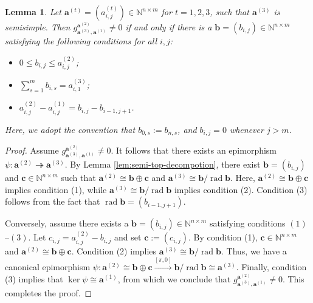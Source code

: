 \documentclass[12pt]{amsart}
\newtheorem{lemma}[theorem]{Lemma}
\theoremstyle{remark}
\theoremstyle{definition}
\numberwithin{equation}{section}
\begin{document}
\begin{lemma}\label{lem:condition-hall-number-non-zero}
    Let $ \mathbf{a}^{(t)}=(a_{i,j}^{(t)})\in \mathbb{N}^{n\times m}$ for $t=1,2,3$, such that $\mathbf{a}^{(3)}$ is semisimple. Then $g_{\mathbf{a}^{(3)},\mathbf{a}^{(1)}}^{\mathbf{a}^{(2)}}\neq 0$ if and only if  there is a $\mathbf{b}=(b_{i,j})\in \mathbb{N}^{n\times m}$ satisfying the following conditions for all $i,j$:
    \begin{itemize}
        \item[(1)] $0\leq b_{i,j}\leq a_{i,j}^{(2)}$;
        \item[(2)] $\sum_{s=1}^mb_{i,s}=a_{i,1}^{(3)}$;
        \item[(3)] $a_{i,j}^{(2)}-a_{i,j}^{(1)}=b_{i,j}-b_{i-1,j+1}$.
    \end{itemize}
  Here, we adopt the convention that $b_{0,s} := b_{n,s}$, and $b_{i,j} = 0$ whenever $j > m$.
\end{lemma}
\begin{proof}
    
Assume $g_{\mathbf{a}^{(3)},\mathbf{a}^{(1)}}^{\mathbf{a}^{(2)}}\neq 0$. It follows that there exists an epimorphism $\psi:\mathbf{a}^{(2)}\twoheadrightarrow \mathbf{a}^{(3)}$. By Lemma \ref{lem:semi-top-decompotion}, there exist $\mathbf{b}=(b_{i,j})$ and $\mathbf{c}\in \mathbb{N}^{n\times m}$ such that $\mathbf{a}^{(2)}\cong \mathbf{b}\oplus \mathbf{c}$ and $\mathbf{a}^{(3)}\cong \mathbf{b}/\operatorname{rad} \mathbf{b}$. Here, $\mathbf{a}^{(2)}\cong \mathbf{b}\oplus \mathbf{c}$ implies condition (1), while $\mathbf{a}^{(3)}\cong \mathbf{b}/\operatorname{rad} \mathbf{b}$ implies condition (2). Condition (3) follows from the fact that $\operatorname{rad}\mathbf{b}=(b_{i-1,j+1})$.

Conversely, assume there exists a $\mathbf{b}=(b_{i,j})\in \mathbb{N}^{n\times m}$ satisfying conditions $(1)$–$(3)$. Let $c_{i,j}=a_{i,j}^{(2)}-b_{i,j}$ and set $\mathbf{c}:=(c_{i,j})$. By condition (1), $\mathbf{c}\in \mathbb{N}^{n\times m}$ and $\mathbf{a}^{(2)}\cong \mathbf{b}\oplus \mathbf{c}$. Condition (2) implies $\mathbf{a}^{(3)}\cong \mathbf{b}/\operatorname{rad}\mathbf{b}$. Thus, we have a canonical epimorphism $\psi:\mathbf{a}^{(2)}\cong \mathbf{b}\oplus \mathbf{c}\xrightarrow{[\pi,0]} \mathbf{b}/\operatorname{rad}\mathbf{b}\cong \mathbf{a}^{(3)}$. Finally, condition (3) implies that $\ker \psi\cong \mathbf{a}^{(1)}$, from which we conclude that $g_{\mathbf{a}^{(3)},\mathbf{a}^{(1)}}^{\mathbf{a}^{(2)}}\neq 0$. This completes the proof.
    
    
\end{proof}
\end{document}

